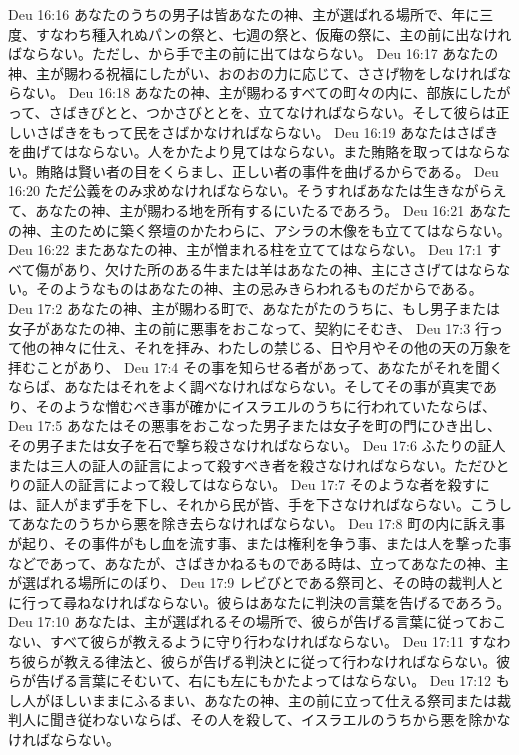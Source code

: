 Deu 16:16  あなたのうちの男子は皆あなたの神、主が選ばれる場所で、年に三度、すなわち種入れぬパンの祭と、七週の祭と、仮庵の祭に、主の前に出なければならない。ただし、から手で主の前に出てはならない。
Deu 16:17  あなたの神、主が賜わる祝福にしたがい、おのおの力に応じて、ささげ物をしなければならない。
Deu 16:18  あなたの神、主が賜わるすべての町々の内に、部族にしたがって、さばきびとと、つかさびととを、立てなければならない。そして彼らは正しいさばきをもって民をさばかなければならない。
Deu 16:19  あなたはさばきを曲げてはならない。人をかたより見てはならない。また賄賂を取ってはならない。賄賂は賢い者の目をくらまし、正しい者の事件を曲げるからである。
Deu 16:20  ただ公義をのみ求めなければならない。そうすればあなたは生きながらえて、あなたの神、主が賜わる地を所有するにいたるであろう。
Deu 16:21  あなたの神、主のために築く祭壇のかたわらに、アシラの木像をも立ててはならない。
Deu 16:22  またあなたの神、主が憎まれる柱を立ててはならない。
Deu 17:1  すべて傷があり、欠けた所のある牛または羊はあなたの神、主にささげてはならない。そのようなものはあなたの神、主の忌みきらわれるものだからである。
Deu 17:2  あなたの神、主が賜わる町で、あなたがたのうちに、もし男子または女子があなたの神、主の前に悪事をおこなって、契約にそむき、
Deu 17:3  行って他の神々に仕え、それを拝み、わたしの禁じる、日や月やその他の天の万象を拝むことがあり、
Deu 17:4  その事を知らせる者があって、あなたがそれを聞くならば、あなたはそれをよく調べなければならない。そしてその事が真実であり、そのような憎むべき事が確かにイスラエルのうちに行われていたならば、
Deu 17:5  あなたはその悪事をおこなった男子または女子を町の門にひき出し、その男子または女子を石で撃ち殺さなければならない。
Deu 17:6  ふたりの証人または三人の証人の証言によって殺すべき者を殺さなければならない。ただひとりの証人の証言によって殺してはならない。
Deu 17:7  そのような者を殺すには、証人がまず手を下し、それから民が皆、手を下さなければならない。こうしてあなたのうちから悪を除き去らなければならない。
Deu 17:8  町の内に訴え事が起り、その事件がもし血を流す事、または権利を争う事、または人を撃った事などであって、あなたが、さばきかねるものである時は、立ってあなたの神、主が選ばれる場所にのぼり、
Deu 17:9  レビびとである祭司と、その時の裁判人とに行って尋ねなければならない。彼らはあなたに判決の言葉を告げるであろう。
Deu 17:10  あなたは、主が選ばれるその場所で、彼らが告げる言葉に従っておこない、すべて彼らが教えるように守り行わなければならない。
Deu 17:11  すなわち彼らが教える律法と、彼らが告げる判決とに従って行わなければならない。彼らが告げる言葉にそむいて、右にも左にもかたよってはならない。
Deu 17:12  もし人がほしいままにふるまい、あなたの神、主の前に立って仕える祭司または裁判人に聞き従わないならば、その人を殺して、イスラエルのうちから悪を除かなければならない。
